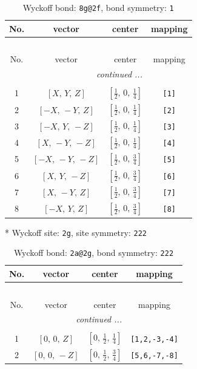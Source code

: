\documentclass[fleqn,8pt]{jsarticle}
\begin{document}
\begin{longtable}{cccc}
\caption{Wyckoff bond: {\tt 8g@2f}, bond symmetry: {\tt 1}}
 \\
 \hline \hline
No. & vector & center & mapping \\ \hline \endfirsthead

\multicolumn{3}{l}{\tablename\ \thetable{}} \\
 \hline \hline
No. & vector & center & mapping \\ \hline \endhead

 \hline \hline
\multicolumn{3}{r}{\footnotesize\it continued ...} \\ \endfoot

 \hline \hline
\multicolumn{3}{r}{} \\ \endlastfoot

1 & $\left[ X,\, Y,\, Z \right]$ & $\left[ \frac{1}{2},\, 0,\, \frac{1}{4} \right]$ & {\tt [1]} \\ \hline
2 & $\left[ - X,\, - Y,\, Z \right]$ & $\left[ \frac{1}{2},\, 0,\, \frac{1}{4} \right]$ & {\tt [2]} \\ \hline
3 & $\left[ - X,\, Y,\, - Z \right]$ & $\left[ \frac{1}{2},\, 0,\, \frac{1}{4} \right]$ & {\tt [3]} \\ \hline
4 & $\left[ X,\, - Y,\, - Z \right]$ & $\left[ \frac{1}{2},\, 0,\, \frac{1}{4} \right]$ & {\tt [4]} \\ \hline
5 & $\left[ - X,\, - Y,\, - Z \right]$ & $\left[ \frac{1}{2},\, 0,\, \frac{3}{4} \right]$ & {\tt [5]} \\ \hline
6 & $\left[ X,\, Y,\, - Z \right]$ & $\left[ \frac{1}{2},\, 0,\, \frac{3}{4} \right]$ & {\tt [6]} \\ \hline
7 & $\left[ X,\, - Y,\, Z \right]$ & $\left[ \frac{1}{2},\, 0,\, \frac{3}{4} \right]$ & {\tt [7]} \\ \hline
8 & $\left[ - X,\, Y,\, Z \right]$ & $\left[ \frac{1}{2},\, 0,\, \frac{3}{4} \right]$ & {\tt [8]} \\
\end{longtable}
* Wyckoff site: {\tt 2g}, site symmetry: {\tt 222}
\renewcommand{\arraystretch}{1.2}
\begin{longtable}{cccc}
\caption{Wyckoff bond: {\tt 2a@2g}, bond symmetry: {\tt 222}}
 \\
 \hline \hline
No. & vector & center & mapping \\ \hline \endfirsthead

\multicolumn{3}{l}{\tablename\ \thetable{}} \\
 \hline \hline
No. & vector & center & mapping \\ \hline \endhead

 \hline \hline
\multicolumn{3}{r}{\footnotesize\it continued ...} \\ \endfoot

 \hline \hline
\multicolumn{3}{r}{} \\ \endlastfoot

1 & $\left[ 0,\, 0,\, Z \right]$ & $\left[ 0,\, \frac{1}{2},\, \frac{1}{4} \right]$ & {\tt [1,2,-3,-4]} \\ \hline
2 & $\left[ 0,\, 0,\, - Z \right]$ & $\left[ 0,\, \frac{1}{2},\, \frac{3}{4} \right]$ & {\tt [5,6,-7,-8]} \\
\end{longtable}
\end{document}
